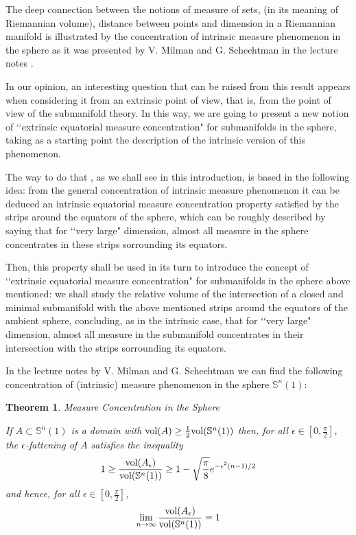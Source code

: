 \documentclass{amsart}
\newtheorem{theorem}{Theorem}[section]
\theoremstyle{definition}
\theoremstyle{remark}
\begin{document}
The deep connection between the notions of measure of sets, (in its meaning of Riemannian volume), distance between points and dimension in a Riemannian manifold is illustrated by the concentration of intrinsic measure phenomenon in the sphere as it was presented  by V. Milman and G. Schechtman in the lecture notes \cite{MS}.

In our opinion, an interesting question that can be raised from this result appears when considering it from an extrinsic point of view, that is, from the point of view of the submanifold theory. In this way, we are going to present a new notion of \lq\lq extrinsic equatorial measure concentration"  for submanifolds in the sphere, taking as a starting point the description of the intrinsic version of this phenomenon.  

The way to do that , as we shall see in this introduction, is based in the following idea:  from the general  concentration of intrinsic measure phenomenon it can be deduced an intrinsic equatorial measure concentration property satisfied by the strips around the equators of the sphere, which can be roughly described by saying that for \lq\lq very large" dimension, almost all measure in the sphere concentrates in these strips sorrounding its equators. 

Then, this property shall be used in its turn to introduce  the concept of \lq\lq extrinsic equatorial measure concentration"  for submanifolds in the sphere above mentioned: we shall study the relative volume of the intersection of a closed and minimal submanifold with the above mentioned strips around the equators of the ambient sphere, concluding, as in the intrinsic case, that for \lq\lq very large" dimension, almost all measure in the submanifold concentrates in their intersection with the  strips sorrounding its equators. 

In the lecture notes by V. Milman and G. Schechtman \cite{MS} we can find the following concentration of (intrinsic) measure phenomenon in the sphere $\mathbb{S}^n(1)$:

\begin{theorem}{Measure Concentration in the Sphere}\label{measurecon}
\medskip

If $A\subset \mathbb{S}^n(1)$ is a domain with ${\rm vol }(A)\geq \frac{1}{2} {\rm vol}(\mathbb{S}^n(1))$ then, for all $\epsilon \in [0,\frac{\pi}{2}]$, the  $\epsilon$-fattening of $A$ satisfies the inequality
\begin{equation}\label{eq1}
1 \geq \frac{{\rm vol}(A_\epsilon)}{{\rm vol}(\mathbb{S}^n(1))}\geq 1-\sqrt{\frac{\pi}{8}}e^{-\epsilon^2(n-1)/2}
\end{equation}
\noindent and hence, for all $\epsilon \in [0,\frac{\pi}{2}]$, 
\begin{equation}\label{eq2}
\lim_{n\to \infty} \frac{{\rm vol}(A_\epsilon)}{{\rm vol}(\mathbb{S}^n(1))}= 1
\end{equation}
\end{theorem}  
\end{document}

